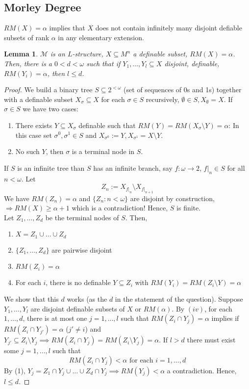 \documentclass[letterpaper, 12pt]{article}
\newcommand{\cM}{\mathcal{M}}
\theoremstyle{stdthm}
\newtheorem{lem}[thm]{Lemma}
\theoremstyle{stddef}
\theoremstyle{stdnonum}
\theoremstyle{stdqands}
\theoremstyle{stdbold}
\begin{document}

\subsection{Morley Degree}
$RM(X) = \alpha$ implies that $X$ does not contain infinitely many disjoint defiable subsets of rank $\alpha$ in any elementary extension. 


\begin{lem}\label{lem6}
$\cM$ is an $L$-structure, $X\subseteq M^n$ a definable subset, $RM(X) = \alpha$. Then, there is a $0 < d < \omega$ such that if $Y_1,\dots,Y_l \subseteq X$ disjoint, definable, $RM(Y_i) = \alpha$, then $l \leq d$. 
\end{lem}

\begin{proof}
We build  a binary tree $S \subseteq 2^{<\omega}$ (set of sequences of 0s and 1s) together with a definable subset $X_\sigma \subseteq X$ for each $\sigma \in S$ recursively, $\emptyset \in S, X_\emptyset = X$. If $\sigma \in S$ we have two cases: 
\begin{enumerate}
\item There exists $Y \subseteq X_\sigma$ definable such that $RM(Y) = RM(X_\sigma\setminus Y) = \alpha$: In this case set $\sigma^0,\sigma^1 \in S$ and $X_{\sigma^0}:= Y, X_{\sigma^1} = X \setminus Y$. 
\item No such $Y$, then $\sigma$ is a terminal node in $S$. 
\end{enumerate}
If $S$ is an infinite tree than $S$ has an infinite branch, say $f: \omega \to 2$, $f|_n \in S$ for all $n< \omega$. Let 
\[Z_n := X_{f|_n} \setminus X_{f|_{n+1}}\] 
We have $RM(Z_n) = \alpha$ and $\{Z_n: n<\omega\}$ are disjoint by construction, $\Rightarrow RM(X) \geq \alpha + 1$ which is a contradiction! Hence, $S$ is finite. \\

Let $Z_1,\dots, Z_d$ be the terminal nodes of $S$. Then,
\begin{enumerate}
\item $X = Z_1 \cup \dots \cup Z_d$
\item $\{Z_1,\dots, Z_d\}$ are pairwise disjoint
\item $RM(Z_i) = \alpha$ 
\item For each $i$, there is no definable $Y \subseteq Z_i$ with $RM(Y_i) = RM(Z_i \setminus Y) = \alpha$ 
\end{enumerate}
We show that this $d$ works (as the $d$ in the statement of the question). Suppose $Y_1,\dots, Y_l$ are disjoint definable subsets of $X$ or $RM(\alpha)$. By $(iv)$, for each $1,\dots, d$, there is at most one $j=1,\dots, l$ such that $RM(Z_i \cap Y_j) = \alpha$ implies if $RM(Z_i \cap Y_{j'}) = \alpha$ ($j'\neq i$) and $Y_{j'} \subseteq Z_i \setminus Y_j \implies RM(Z_i \cap Y_j) = RM(Z_i \setminus Y_j) = \alpha$. If $l > d$ there must exist some $j=1,\dots, l$ such that 
\[ RM(Z_i \cap Y_j) < \alpha \mbox{ for each } i=1,\dots, d \]
By (1), $Y_j = Z_1\cap Y_j \cup \dots \cup Z_d \cap Y_j \implies RM(Y_j) < \alpha$ a contradiction. Hence, $l \leq d$.  

\end{proof}
\end{document}

